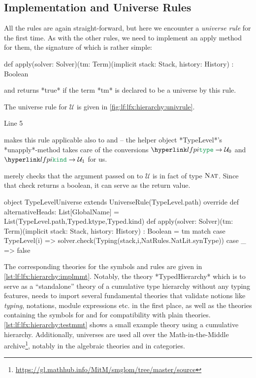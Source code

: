 \subsection{Implementation and Universe Rules}\label{sec:lf:lfx:hierarchy:univrules}
All the rules are again straight-forward, but here we encounter a \emph{universe rule} for the first time. As with the other rules, we need to implement an apply method for them, the signature of which is rather simple:
\begin{scalacode}
def apply(solver: Solver)(tm: Term)(implicit stack: Stack, history: History) : Boolean
\end{scalacode}
and returns *true* if the term *tm* is declared to be a universe by this rule.

\begin{example}
	The universe rule for $\mathcal U$ is given in \autoref{fig:lf:lfx:hierarchy:univrule}.
	\begin{labeling}{Line 5}
	\item[Line 2] makes this rule applicable also to \type and \kind -- the helper object *TypeLevel*'s *unapply*-method takes care of the conversions $\type\to\mathcal U_0$ and $\kind\to\mathcal U_1$ for us.
	\item[Line 5] merely checks that the argument passed on to $\mathcal U$ is in fact of type $\textsc{Nat}$. Since that check returns a boolean, it can serve as the return value.
\end{labeling}
	
		\begin{nscalacode}[label=fig:lf:lfx:hierarchy:univrule,caption={The Universe Rule for $\mathcal U$\protect\footnotemark},emph={TypeLevel,ktype,kind}]
object TypeLevelUniverse extends UniverseRule(TypeLevel.path) {
  override def alternativeHeads: List[GlobalName] = List(TypeLevel.path,Typed.ktype,Typed.kind)
  def apply(solver: Solver)(tm: Term)(implicit stack: Stack, history: History) : Boolean = tm match {
    case TypeLevel(i) =>
      solver.check(Typing(stack,i,NatRules.NatLit.synType))
    case _ => false
  }
}
	\end{nscalacode}
\end{example}

The corresponding theories for the symbols and rules are given in \autoref{lst:lf:lfx:hierarchy:implmmt}. Notably, the theory *TypedHierarchy* which is to serve as a ``standalone'' theory of a cumulative type hierarchy without any typing features, needs to import several fundamental \mmt theories that validate notions like \emph{typing}, notations, module expressions etc. in the first place, as well as the theories containing the symbols for \type and \kind for compatibility with plain \LF theories. \autoref{lst:lf:lfx:hierarchy:testmmt} shows a small example theory using a cumulative hierarchy. Additionally, universes are used all over the Math-in-the-Middle archive\footnote{\url{https://gl.mathhub.info/MitM/smglom/tree/master/source}}, notably in the algebraic theories and in categories.

